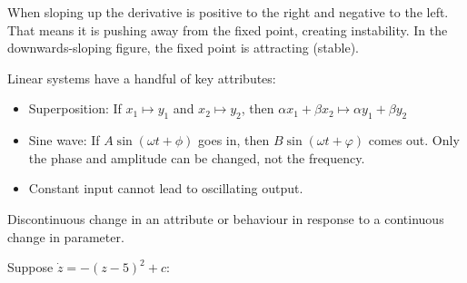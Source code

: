 \documentclass[class=pmath370,tikz,notes]{agony}
\begin{document}
\begin{center}  
  \quad
\end{center}

When sloping up the derivative is positive to the right and negative to the left.
That means it is pushing away from the fixed point, creating instability.
In the downwards-sloping figure, the fixed point is attracting (stable).

Linear systems have a handful of key attributes:
\begin{itemize}
  \item Superposition: If $x_1 \mapsto y_1$ and $x_2 \mapsto y_2$,
        then $\alpha x_1 + \beta x_2 \mapsto \alpha y_1 + \beta y_2$
  \item Sine wave: If $A\sin(\omega t + \phi)$ goes in,
        then $B\sin(\omega t + \varphi)$ comes out.
        Only the phase and amplitude can be changed, not the frequency.
  \item Constant input cannot lead to oscillating output.
\end{itemize}

\begin{defn*}[bifurcation]
  Discontinuous change in an attribute or behaviour
  in response to a continuous change in parameter.
\end{defn*}

Suppose $\dot z = -(z-5)^2 + c$:
\end{document}
